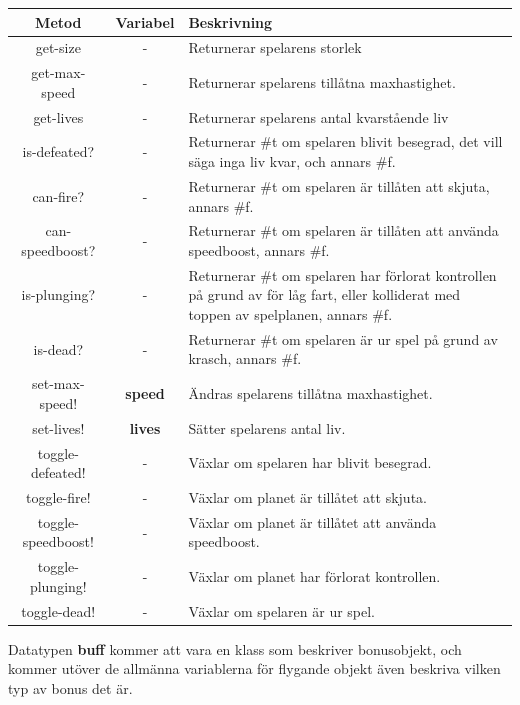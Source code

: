 \documentclass[12pt,a4paper]{article}
\newcounter{subsubsubsection}[subsubsection]
\begin{document}
\vspace{0.2cm}

\begin{tabular}{| c | c | p{7.8cm} |}
	\hline
	\textbf{Metod} & \textbf{Variabel} & \textbf{Beskrivning} \\
	\hline
	
	get-size & - & Returnerar spelarens storlek \\
	\hline	
	get-max-speed & - & Returnerar spelarens tillåtna maxhastighet. \\
	\hline
	get-lives & - & Returnerar spelarens antal kvarstående liv \\
	\hline
	is-defeated? & - & Returnerar \#t om spelaren blivit besegrad, det vill säga inga liv kvar, och annars \#f. \\
	\hline
	can-fire? & - & Returnerar \#t om spelaren är tillåten att skjuta, annars \#f.\\
	\hline
	can-speedboost? & - & Returnerar \#t om spelaren är tillåten att använda speedboost, annars \#f. \\
	\hline
	is-plunging? & - & Returnerar \#t om spelaren har förlorat kontrollen på grund av för låg fart, eller kolliderat med toppen av spelplanen, annars \#f. \\
	\hline
	is-dead? & - & Returnerar \#t om spelaren är ur spel på grund av krasch, annars \#f. \\
	\hline
	set-max-speed! & \small\textbf{speed} & Ändras spelarens tillåtna maxhastighet. \\
	\hline
	set-lives! & \small\textbf{lives} & Sätter spelarens antal liv. \\
	\hline
	toggle-defeated! & - & Växlar om spelaren har blivit besegrad. \\
	\hline
	toggle-fire! & - & Växlar om planet är tillåtet att skjuta.\\
	\hline
	toggle-speedboost! & - & Växlar om planet är tillåtet att använda speedboost. \\
	\hline
	toggle-plunging! & - & Växlar om planet har förlorat kontrollen. \\
	\hline
	toggle-dead! & - & Växlar om spelaren är ur spel. \\
	\hline
	
\end{tabular}

Datatypen \textbf{buff} kommer att vara en klass som beskriver bonusobjekt, och kommer utöver de allmänna variablerna för flygande objekt även beskriva vilken typ av bonus det är. \\
\end{document}
